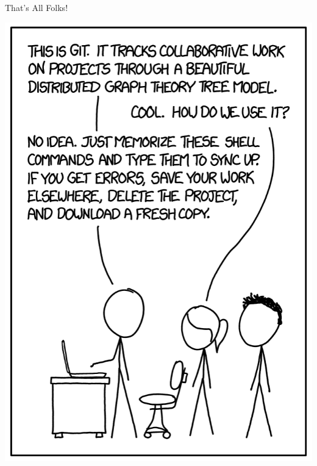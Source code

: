\documentclass[10pt]{beamer}
\begin{document}
\appendix

\begin{frame}[standout]
    That's All Folks!
\end{frame}

\begin{frame}{}
    \centerline{\includegraphics[height=0.9\textheight]{img/bd2.png}}
\end{frame}
\end{document}
